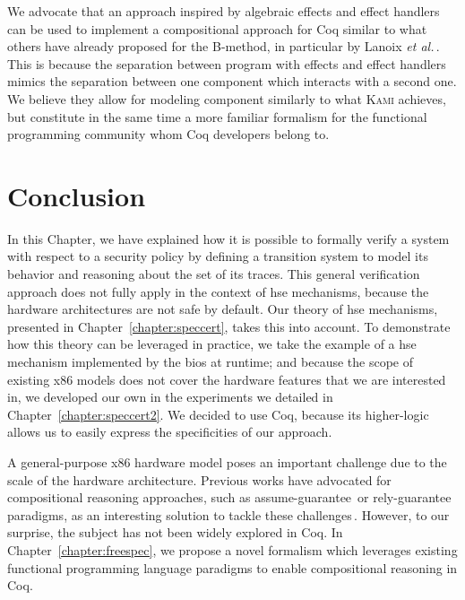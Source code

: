 We advocate that an approach inspired by algebraic effects and effect handlers
can be used to implement a compositional approach for Coq similar to what others
have already proposed for the B-method, in particular by Lanoix \emph{et
  al.}\,\cite{lanoix:hal-00105041}.
%
This is because the separation between program with effects and effect handlers
mimics the separation between one component which interacts with a second one.
%
We believe they allow for modeling component similarly to what {\scshape Kami}
achieves, but constitute in the same time a more familiar formalism for the
functional programming community whom Coq developers belong to.

\section{Conclusion}
\label{sec:sota:conclusion}

In this Chapter, we have explained how it is possible to formally verify a
system with respect to a security policy by defining a transition system to
model its behavior and reasoning about the set of its traces.
%
This general verification approach does not fully apply in the context of
\ac{hse} mechanisms, because the hardware architectures are not safe by default.
%
Our theory of \ac{hse} mechanisms, presented in Chapter~\ref{chapter:speccert},
takes this into account.
%
To demonstrate how this theory can be leveraged in practice, we take the example
of a \ac{hse} mechanism implemented by the \ac{bios} at runtime; and because the
scope of existing x86 models does not cover the hardware features that we are
interested in, we developed our own in the experiments we detailed in
Chapter~\ref{chapter:speccert2}.
%
We decided to use Coq, because its higher-logic allows us to easily express the
specificities of our approach.
%

A general-purpose x86 hardware model poses an important challenge due to the
scale of the hardware architecture.
%
Previous works have advocated for compositional reasoning approaches, such as
assume-guarantee\,\cite{pnueli1985ag} or
rely-guarantee\,\cite{jones1983tentative} paradigms, as an interesting solution
to tackle these challenges\,\cite{garg2010compositional,heyman2012securemodel}.
%
However, to our surprise, the subject has not been widely explored in Coq.
%
In Chapter~\ref{chapter:freespec}, we propose a novel formalism which leverages
existing functional programming language paradigms to enable compositional
reasoning in Coq.